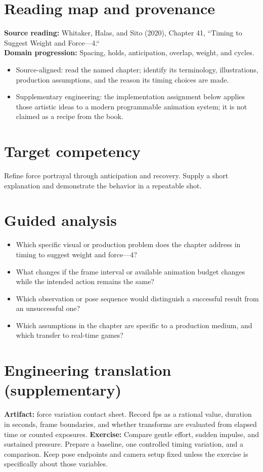\documentclass[10pt,letterpaper]{article}
\begin{document}
\makedoctitle
\makedocsummary

\section{Reading map and provenance}
\textbf{Source reading:} Whitaker, Halas, and Sito (2020), Chapter 41, ``Timing to Suggest Weight and Force—4.``\\
\textbf{Domain progression:} Spacing, holds, anticipation, overlap, weight, and cycles.
\begin{itemize}
\item Source-aligned: read the named chapter; identify its terminology, illustrations, production assumptions, and the reason its timing choices are made.
\item Supplementary engineering: the implementation assignment below applies those artistic ideas to a modern programmable animation system; it is not claimed as a recipe from the book.
\end{itemize}
\section{Target competency}
Refine force portrayal through anticipation and recovery. Supply a short explanation and demonstrate the behavior in a repeatable shot.
\section{Guided analysis}
\begin{itemize}
\item Which specific visual or production problem does the chapter address in timing to suggest weight and force—4?
\item What changes if the frame interval or available animation budget changes while the intended action remains the same?
\item Which observation or pose sequence would distinguish a successful result from an unsuccessful one?
\item Which assumptions in the chapter are specific to a production medium, and which transfer to real-time games?
\end{itemize}
\section{Engineering translation (supplementary)}
\textbf{Artifact:} force variation contact sheet. Record fps as a rational value, duration in seconds, frame boundaries, and whether transforms are evaluated from elapsed time or counted exposures.
\textbf{Exercise:} Compare gentle effort, sudden impulse, and sustained pressure. Prepare a baseline, one controlled timing variation, and a comparison. Keep pose endpoints and camera setup fixed unless the exercise is specifically about those variables.
\end{document}
